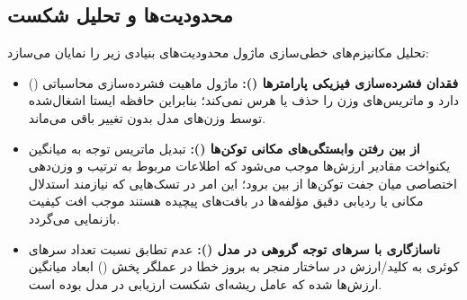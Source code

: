 \subsection{محدودیت‌ها و تحلیل شکست}
تحلیل مکانیزم‌های خطی‌سازی ماژول  محدودیت‌های بنیادی زیر را نمایان می‌سازد:
\begin{itemize}
    \item \textbf{فقدان فشرده‌سازی فیزیکی پارامترها ():} ماژول  ماهیت فشرده‌سازی محاسباتی () دارد و ماتریس‌های وزن را حذف یا هرس نمی‌کند؛ بنابراین حافظه ایستا اشغال‌شده توسط وزن‌های مدل بدون تغییر باقی می‌ماند.
    \item \textbf{از بین رفتن وابستگی‌های مکانی توکن‌ها ():} تبدیل ماتریس توجه به میانگین یکنواخت مقادیر ارزش‌ها موجب می‌شود که اطلاعات مربوط به ترتیب و وزن‌دهی اختصاصی میان جفت توکن‌ها از بین برود؛ این امر در تسک‌هایی که نیازمند استدلال مکانی یا ردیابی دقیق مؤلفه‌ها در بافت‌های پیچیده هستند موجب افت کیفیت بازنمایی می‌گردد.
    \item \textbf{ناسازگاری با سرهای توجه گروهی در مدل  ():} عدم تطابق نسبت تعداد سرهای کوئری به کلید/ارزش در ساختار  منجر به بروز خطا در عملگر پخش () ابعاد میانگین ارزش‌ها شده که عامل ریشه‌ای شکست ارزیابی در مدل  بوده است.
\end{itemize}
